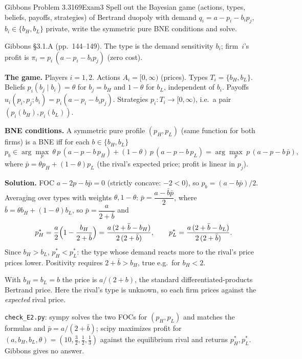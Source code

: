 \begin{exsol}{Gibbons Problem 3.3}{169}{Exam}{3}
\asked Spell out the Bayesian game (actions, types, beliefs, payoffs, strategies) of Bertrand
duopoly with demand $q_i=a-p_i-b_ip_j$, $b_i\in\{b_H,b_L\}$ private, write the symmetric pure BNE
conditions and solve.

\method Gibbons \S3.1.A (pp.~144--149). The type is the demand sensitivity $b_i$; firm~$i$'s profit is
$\pi_i=p_i\,(a-p_i-b_ip_j)$ (zero cost).

\solution
\textbf{The game.} Players $i=1,2$. Actions $A_i=[0,\infty)$ (prices). Types $T_i=\{b_H,b_L\}$.
Beliefs $p_i(b_j\mid b_i)=\theta$ for $b_j=b_H$ and $1-\theta$ for $b_L$, independent of $b_i$.
Payoffs $u_i(p_i,p_j;b_i)=p_i(a-p_i-b_ip_j)$. Strategies $p_i:T_i\to[0,\infty)$, i.e.\ a pair
$(p_i(b_H),p_i(b_L))$.

\textbf{BNE conditions.} A symmetric pure profile $(p_H,p_L)$ (same function for both firms) is a
BNE iff for each $b\in\{b_H,b_L\}$
\[
  p_b\in\arg\max_{p}\ \theta\,p\,(a-p-b\,p_H)+(1-\theta)\,p\,(a-p-b\,p_L)
  =\arg\max_p\ p\,(a-p-b\,\bar p),
\]
where $\bar p=\theta p_H+(1-\theta)p_L$ (the rival's expected price; profit is linear in $p_j$).

\textbf{Solution.} FOC $a-2p-b\bar p=0$ (strictly concave: $-2<0$), so $p_b=(a-b\bar p)/2$.
Averaging over types with weights $\theta,1-\theta$: $\bar p=\dfrac{a-\bar b\bar p}{2}$, where
$\bar b=\theta b_H+(1-\theta)b_L$, so $\bar p=\dfrac{a}{2+\bar b}$ and
\[
  p_H^*=\frac{a}{2}\Bigl(1-\frac{b_H}{2+\bar b}\Bigr)=\frac{a\,(2+\bar b-b_H)}{2\,(2+\bar b)},\qquad
  p_L^*=\frac{a\,(2+\bar b-b_L)}{2\,(2+\bar b)} .
\]
Since $b_H>b_L$, $p_H^*<p_L^*$: the type whose demand reacts more to the rival's price prices lower.
Positivity requires $2+\bar b>b_H$, true e.g.\ for $b_H<2$.

\interp With $b_H=b_L=b$ the price is $a/(2+b)$, the standard differentiated-products Bertrand price.
Here the rival's type is unknown, so each firm prices against the \emph{expected} rival price.

\verify \texttt{check\_E2.py}: sympy solves the two FOCs for $(p_H,p_L)$ and matches the
formulas and $\bar p=a/(2+\bar b)$; scipy maximizes profit for $(a,b_H,b_L,\theta)=(10,\tfrac32,\tfrac12,\tfrac13)$ against the
equilibrium rival and returns $p_H^*,p_L^*$. Gibbons gives no answer.

\end{exsol}
